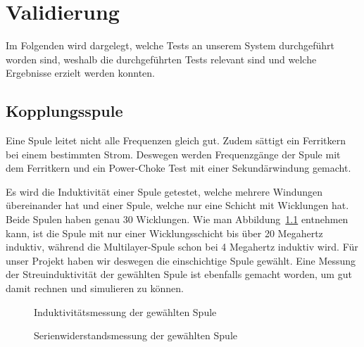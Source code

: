 \chapter{Validierung}
\label{chap:validierung}

Im Folgenden  wird dargelegt,  welche Tests  an unserem  System durchgef\"uhrt
worden  sind, weshalb  die  durchgef\"uhrten Tests  relevant  sind und  welche
Ergebnisse erzielt werden konnten.

\section{Kopplungsspule}
\label{sec:val:coupling:coil}

Eine  Spule  leitet nicht  alle  Frequenzen  gleich gut. Zudem  s\"attigt  ein
Ferritkern  bei einem  bestimmten Strom. Deswegen  werden Frequenzg\"ange  der
Spule mit dem Ferritkern und  ein Power-Choke Test mit einer Sekund\"arwindung
gemacht.

Es   wird   die   Induktivit\"at   einer  Spule   getestet,   welche   mehrere
Windungen  \"ubereinander  hat  und  einer  Spule,  welche  nur  eine  Schicht
mit  Wicklungen   hat. Beide  Spulen   haben  genau  30   Wicklungen. Wie  man
Abbildung~\ref{fig:meas:coupling:coil:L} entnehmen kann, ist die Spule mit nur
einer  Wicklungsschicht  bis  \"uber  20  Megahertz  induktiv,  w\"ahrend  die
Multilayer-Spule  schon bei  4  Megahertz induktiv  wird. F\"ur unser  Projekt
haben  wir  deswegen  die  einschichtige  Spule  gew\"ahlt. Eine  Messung  der
Streuinduktivit\"at der gew\"ahlten Spule ist ebenfalls gemacht worden, um gut
damit rechnen und simulieren zu k\"onnen.

\begin{figure}[h!tb]
    \centering
    
    \caption[Messresultate Kopplungsspule]{Induktivitätsmessung der gewählten Spule}
    \label{fig:meas:coupling:coil:L}
\end{figure}

\begin{figure}[h!tb]
    \centering
    
    \caption[Messresultate Kopplungsspule]{Serienwiderstandsmessung der gewählten Spule}
    \label{fig:meas:coupling:coil:R}
\end{figure}

